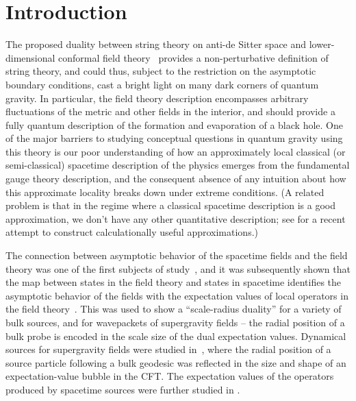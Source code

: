 \documentclass[a4paper,12pt]{article}
\begin{document}
\newpage
\setcounter{footnote}{0} 
\renewcommand{\thefootnote}{\arabic{footnote}} 

\section{Introduction}

The proposed duality between string theory on anti-de Sitter space and
lower-dimensional conformal field theory~\cite{juanads} provides a
non-perturbative definition of string theory, and could thus, subject
to the restriction on the asymptotic boundary conditions, cast a
bright light on many dark corners of quantum gravity. In particular,
the field theory description encompasses arbitrary fluctuations of the
metric and other fields in the interior, and should provide a fully
quantum description of the formation and evaporation of a black hole.
One of the major barriers to studying conceptual questions in quantum
gravity using this theory is our poor understanding of how an
approximately local classical (or semi-classical) spacetime
description of the physics emerges from the fundamental gauge theory
description, and the consequent absence of any intuition about how
this approximate locality breaks down under extreme conditions. (A
related problem is that in the regime where a classical spacetime
description is a good approximation, we don't have any other
quantitative description; see \cite{kabat:approx} for a recent attempt
to construct calculationally useful approximations.)

The connection between asymptotic behavior of the spacetime fields and
the field theory was one of the first subjects of
study~\cite{witten,gkp}, and it was subsequently shown that the map
between states in the field theory and states in spacetime identifies
the asymptotic behavior of the fields with the expectation values of
local operators in the field theory~\cite{bklt}.  This was used to
show a ``scale-radius duality'' for a variety of bulk sources, and for
wavepackets of supergravity fields -- the radial position of a bulk
probe is encoded in the scale size of the dual expectation values.
Dynamical sources for supergravity fields were studied in~\cite{dkk},
where the radial position of a source particle following a bulk
geodesic was reflected in the size and shape of an expectation-value
bubble in the CFT.  The expectation values of the operators produced
by spacetime sources were further studied in
\cite{bdhm,esko1,amanda,garysunny,bakrey,sumit1,joeetal}.
\end{document}
